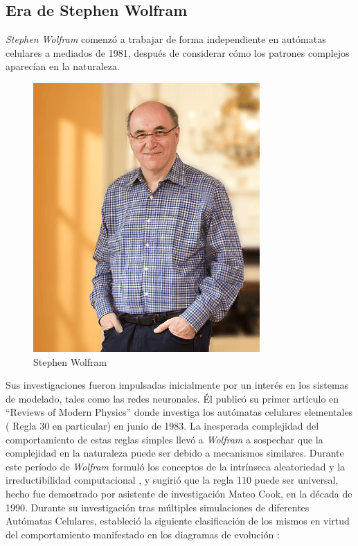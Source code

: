 \subsection{Era de Stephen Wolfram} %
\textit{Stephen Wolfram} comenzó a trabajar de forma independiente en autómatas celulares a mediados de 1981, después de considerar cómo los patrones complejos aparecían en la naturaleza. 
\begin{figure}
\centering
\includegraphics[scale=0.3]{imagenes/stephen.png}
\caption{Stephen Wolfram}
\label{fig:Stephen}
\end{figure}
Sus investigaciones fueron impulsadas inicialmente por un interés en los sistemas de modelado, tales como las redes neuronales. Él publicó su primer artículo en ``Reviews of Modern Physics'' donde investiga los autómatas celulares elementales ( Regla 30 en particular) en junio de 1983. La inesperada complejidad del comportamiento de estas reglas simples llevó a \textit{Wolfram} a sospechar que la complejidad en la naturaleza puede ser debido a mecanismos similares. Durante este período de \textit{Wolfram} formuló los conceptos de la intrínseca aleatoriedad y la irreductibilidad computacional , y sugirió que la regla 110 puede ser universal, hecho fue demostrado por asistente de investigación Mateo Cook, en la década de 1990. Durante su investigación tras múltiples simulaciones de diferentes Autómatas Celulares, estableció la siguiente clasificación de los mismos en virtud del comportamiento manifestado en los diagramas de evolución \cite{wolfram}:
